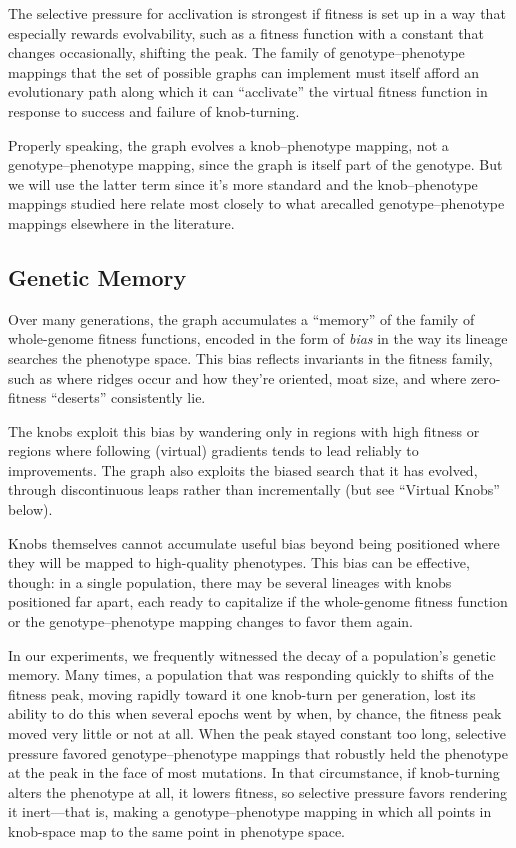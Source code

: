 \documentclass[letterpaper]{article}
\begin{document}
The selective pressure for acclivation is strongest if fitness is set up in a
way that especially rewards evolvability, such as a fitness function with a
constant that changes occasionally, shifting the peak. The family of
genotype--phenotype mappings that the set of possible graphs can implement must
itself afford an evolutionary path along which it can ``acclivate'' the virtual
fitness function in response to success and failure of knob-turning.

Properly speaking, the graph evolves a knob--phenotype mapping, not a
genotype--phenotype mapping, since the graph is itself part of the genotype.
But we will use the latter term since it's more standard and the
knob--phenotype mappings studied here relate most closely to what arecalled
genotype--phenotype mappings elsewhere in the literature.

\subsection{Genetic Memory}

Over many generations, the graph accumulates a ``memory'' of the family of
whole-genome fitness functions, encoded in the form of \textit{bias} in the way
its lineage searches the phenotype space. This bias reflects invariants in the
fitness family, such as where ridges occur and how they're oriented, moat size,
and where zero-fitness ``deserts'' consistently lie.

The knobs exploit this bias by wandering only in regions with high fitness or
regions where following (virtual) gradients tends to lead reliably to
improvements. The graph also exploits the biased search that it has evolved,
through discontinuous leaps rather than incrementally (but see ``Virtual
Knobs'' below).

Knobs themselves cannot accumulate useful bias beyond being positioned where
they will be mapped to high-quality phenotypes. This bias can be effective,
though: in a single population, there may be several lineages with knobs
positioned far apart, each ready to capitalize if the whole-genome fitness
function or the genotype--phenotype mapping changes to favor them again.

In our experiments, we frequently witnessed the decay of a population's genetic
memory. Many times, a population that was responding quickly to shifts of
the fitness peak, moving rapidly toward it one knob-turn per generation, lost
its ability to do this when several epochs went by when, by chance, the fitness
peak moved very little or not at all. When the peak stayed constant too long,
selective pressure favored genotype--phenotype mappings that robustly held the
phenotype at the peak in the face of most mutations. In that circumstance, if
knob-turning alters the phenotype at all, it lowers fitness, so selective
pressure favors rendering it inert---that is, making a genotype--phenotype
mapping in which all points in knob-space map to the same point in phenotype
space.
\end{document}
